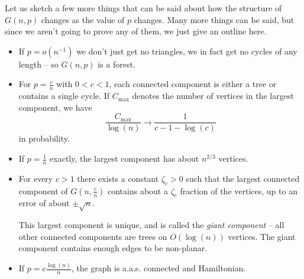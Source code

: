 \documentclass[nobib]{tufte-handout}
\begin{document}
Let us sketch a few more things that can be said about how the structure of $G(n,p)$ changes as the value of $p$ changes. Many more things can be said, but since we aren't going to prove any of them, we just give an outline here.

\begin{itemize}
  \item If $p = o\left(n^{-1}\right)$ we don't just get no triangles, we in fact get no cycles of any length -- so $G(n,p)$ is a forest.
  \item For $p = \frac{c}{n}$ with $0 < c < 1$, each connected component is either a tree or contains a single cycle. If $C_{\max}$ denotes the number of vertices in the largest component, we have
  $$\frac{C_{\max}}{\log(n)} \to \frac{1}{c - 1 - \log(c)}$$
  in probability.
  \item If $p = \frac{1}{n}$ exactly, the largest component has about $n^{2/3}$ vertices.
  \item For every $c > 1$ there exists a constant $\zeta_c > 0$ such that the largest connected component of $G\left(n, \frac{c}{n}\right)$ contains about a $\zeta_c$ fraction of the vertices, up to an error of about $\pm \sqrt{n}$.

  This largest component is unique, and is called the \emph{giant component} -- all other connected components are trees on $O\left(\log(n)\right)$ vertices. The giant component contains enough edges to be non-planar.
  \item If $p = c\frac{\log(n)}{n}$, the graph is a.a.s. connected and Hamiltonian.
\end{itemize}
\end{document}
